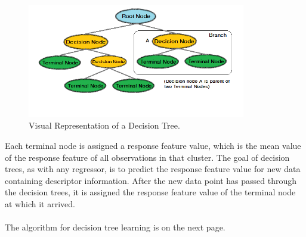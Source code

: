 \begin{figure}[h!]
    \centering
    \includegraphics[width=0.85\textwidth]{Images/Methods/detreenodes.png}
    \caption{Visual Representation of a Decision Tree.}
\end{figure}
Each terminal node is assigned a response feature value, which is the mean value of the response feature of all observations in that cluster. The goal of decision trees, as with any regressor, is to predict the response feature value for new data containing descriptor information. After the new data point has passed through the decision trees, it is assigned the response feature value of the terminal node at which it arrived.\\\\ 
The algorithm for decision tree learning is on the next page.
